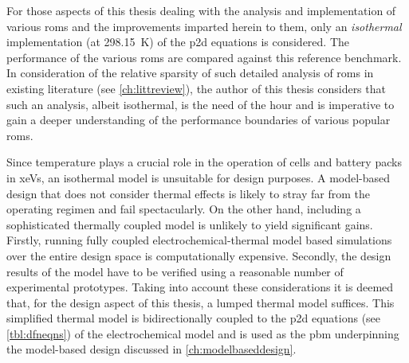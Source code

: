For those aspects of this thesis dealing with the analysis and implementation of
various  \glspl{rom} and  the  improvements  imparted herein  to  them, only  an
\emph{isothermal}  implementation  (at  \SI{298.15}{\kelvin}) of  the  \gls{p2d}
equations  is  considered.  The  performance  of  the  various  \glspl{rom}  are
compared  against this  reference benchmark.  In consideration  of the  relative
sparsity of  such detailed analysis  of \glspl{rom} in existing  literature (see
\cref{ch:littreview}),  the  author  of  this  thesis  considers  that  such  an
analysis, albeit isothermal, is  the need of the hour and  is imperative to gain
a  deeper  understanding  of  the  performance  boundaries  of  various  popular
\glspl{rom}.


Since temperature  plays a crucial  role in the  operation of cells  and battery
packs in \glspl{xeV},  an isothermal model is unsuitable for  design purposes. A
model-based design that does not consider thermal effects is likely to stray far
from the operating regimen and fail  spectacularly. On the other hand, including
a sophisticated thermally coupled model  is unlikely to yield significant gains.
Firstly, running  fully coupled electrochemical-thermal model  based simulations
over the entire design space  is computationally expensive. Secondly, the design
results  of the  model have  to  be verified using  a reasonable  number of 
experimental prototypes.  Taking  into account  these  considerations it  is
deemed  that, for  the design  aspect  of this  thesis, a  lumped thermal  model
suffices.  This  simplified thermal  model  is  bidirectionally coupled  to  the
\gls{p2d} equations  (see \cref{tbl:dfneqns})  of the electrochemical  model and
is  used as  the  \gls{pbm}  underpinning the  model-based  design discussed  in
\cref{ch:modelbaseddesign}.


